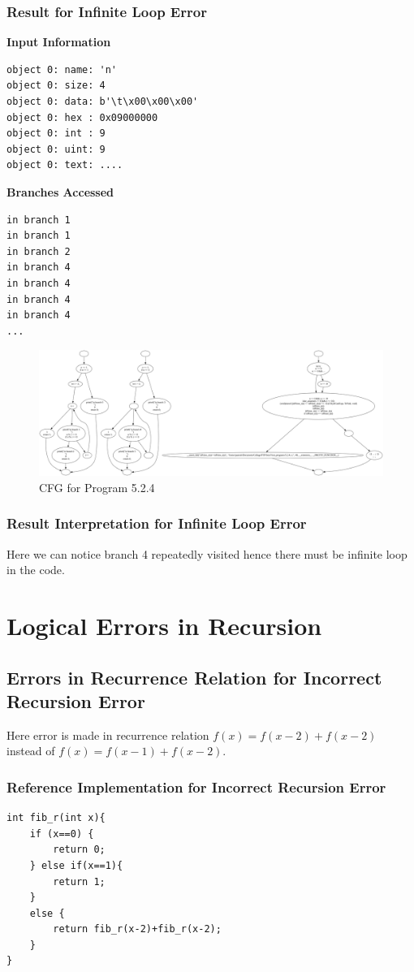 \subsubsection{Result for Infinite Loop Error}
\textbf{Input Information}
\begin{verbatim}
object 0: name: 'n'
object 0: size: 4
object 0: data: b'\t\x00\x00\x00'
object 0: hex : 0x09000000
object 0: int : 9
object 0: uint: 9
object 0: text: ....
\end{verbatim}
\textbf{Branches Accessed}
\begin{verbatim}
in branch 1
in branch 1
in branch 2
in branch 4
in branch 4
in branch 4
in branch 4
...
\end{verbatim}
\begin{figure}[h]
\centering
\includegraphics[width=1\textwidth]{5/5.2.4.c.png}
\caption{CFG for Program 5.2.4}
\label{fig:cfg5.2.4}
\end{figure}
\subsubsection{Result Interpretation for Infinite Loop Error}
Here we can notice branch 4 repeatedly visited hence there must be infinite loop in the code.


\section{Logical Errors in Recursion}
\subsection{Errors in Recurrence Relation for Incorrect Recursion Error}
Here error is made in recurrence relation 
$f(x)=f(x-2)+f(x-2)$ instead of $f(x)=f(x-1)+f(x-2)$.
\subsubsection{Reference Implementation for Incorrect Recursion Error}
\begin{verbatim}
int fib_r(int x){
    if (x==0) {
        return 0;
    } else if(x==1){
        return 1;
    }
    else {
        return fib_r(x-2)+fib_r(x-2);
    }
}
\end{verbatim}
